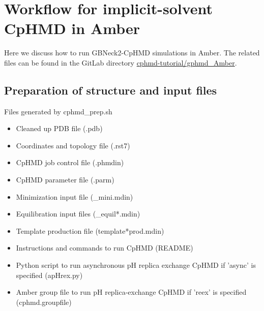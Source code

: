 \section{Workflow for implicit-solvent CpHMD in Amber} 

Here we discuss how to run GBNeck2-CpHMD \cite{Huang_Shen_2018_J.Chem.Inf.Model.,Harris_Shen_2019_J.Chem.Inf.Model.} simulations in Amber.
The related files can be found in the GitLab directory 
\href{https://gitlab.com/shenlab-amber-cphmd/cphmd-tutorial/-/tree/main/gphmd_Amber}{cphmd-tutorial/gphmd\_Amber}.

\subsection{Preparation of structure and input files}
\begin{checklist}{Files generated by cphmd\_prep.sh}
\begin{itemize}
\item Cleaned up PDB file (.pdb)
\item Coordinates and topology file (.rst7)
\item CpHMD job control file (.phmdin)
\item CpHMD parameter file (.parm)
\item Minimization input file (\_mini.mdin)
\item Equilibration input files (\_equil*.mdin)
\item Template production file (template*prod.mdin)
\item Instructions and commands to run CpHMD (README)
\item Python script to run asynchronous pH replica exchange CpHMD if 'async' is specified (apHrex.py)
\item Amber group file to run pH replica-exchange CpHMD if 'reex' is specified (cphmd.groupfile)
\end{itemize}
\end{checklist}

